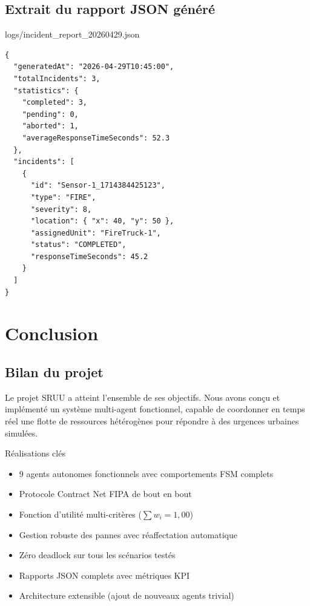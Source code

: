 \documentclass[12pt, a4paper]{report}
\begin{document}
\section{Extrait du rapport JSON généré}

\begin{codebox}{logs/incident\_report\_20260429.json}
\begin{lstlisting}[style=jsonStyle]
{
  "generatedAt": "2026-04-29T10:45:00",
  "totalIncidents": 3,
  "statistics": {
    "completed": 3,
    "pending": 0,
    "aborted": 1,
    "averageResponseTimeSeconds": 52.3
  },
  "incidents": [
    {
      "id": "Sensor-1_1714384425123",
      "type": "FIRE",
      "severity": 8,
      "location": { "x": 40, "y": 50 },
      "assignedUnit": "FireTruck-1",
      "status": "COMPLETED",
      "responseTimeSeconds": 45.2
    }
  ]
}
\end{lstlisting}
\end{codebox}

\chapter{Conclusion}
\label{chap:conclusion}

\section{Bilan du projet}

Le projet SRUU a atteint l'ensemble de ses objectifs. Nous avons conçu et implémenté
un système multi-agent fonctionnel, capable de coordonner en temps réel une flotte de
ressources hétérogènes pour répondre à des urgences urbaines simulées.

\begin{successbox}{Réalisations clés}
\begin{itemize}[noitemsep]
  \item[\checkmark] 9 agents autonomes fonctionnels avec comportements FSM complets
  \item[\checkmark] Protocole Contract Net FIPA de bout en bout
  \item[\checkmark] Fonction d'utilité multi-critères ($\sum w_i = 1{,}00$)
  \item[\checkmark] Gestion robuste des pannes avec réaffectation automatique
  \item[\checkmark] Zéro deadlock sur tous les scénarios testés
  \item[\checkmark] Rapports JSON complets avec métriques KPI
  \item[\checkmark] Architecture extensible (ajout de nouveaux agents trivial)
\end{itemize}
\end{successbox}
\end{document}
